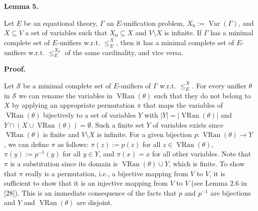 \documentclass[10pt,a4paper]{amsart}
\begin{document}
 
 
\par\medskip\noindent\textbf{Lemma 5.}\par
 
 
Let $E$ be an equational theory, $\Gamma$ an $E$-unification problem, $X_{0}:=\operatorname{Var}(\Gamma)$, and $X\subseteq V$ a set of variables such that $X_{0}\subseteq X$ and $V\setminus X$ is infinite. If $\Gamma$ has a minimal complete set of $E$-unifiers w.r.t. $\leq_{E}^{X}$, then it has a minimal complete set of $E$-unifiers w.r.t. $\leq_{E}^{X_{0}}$ of the same cardinality, and vice versa.\par
 
 
 
 
 
\par\medskip\noindent\textbf{Proof.}\par
 
 
Let $\mathcal{S}$ be a minimal complete set of $E$-unifiers of $\Gamma$ w.r.t. $\leq_{E}^{X}$. For every unifier $\theta$ in $\mathcal{S}$ we can rename the variables in $\operatorname{VRan}(\theta)$ such that they do not belong to $X$ by applying an appropriate permutation $\pi$ that maps the variables of $\operatorname{VRan}(\theta)$ bijectively to a set of variables $Y$ with $|Y|=|\operatorname{VRan}(\theta)|$ and $Y\cap(X\cup\operatorname{VRan}(\theta))=\emptyset$. Such a finite set $Y$ of variables exists since $\operatorname{VRan}(\theta)$ is finite and $V\setminus X$ is infinite. For a given bijection $p:\operatorname{VRan}(\theta)\rightarrow Y$, we can define $\pi$ as follows: $\pi(z):=p(z)$ for all $z\in\operatorname{VRan}(\theta)$, $\pi(y):=p^{-1}(y)$ for all $y\in Y$, and $\pi(x)=x$ for all other variables. Note that $\pi$ is a substitution since its domain is $\operatorname{VRan}(\theta)\cup Y$, which is finite. To show that $\pi$ really is a permutation, i.e., a bijective mapping from $V$ to $V$, it is sufficient to show that it is an injective mapping from $V$ to $V$ (see Lemma 2.6 in [28]). This is an immediate consequence of the facts that $p$ and $p^{-1}$ are bijections and $Y$ and $\operatorname{VRan}(\theta)$ are disjoint.\par
 
\end{document}
